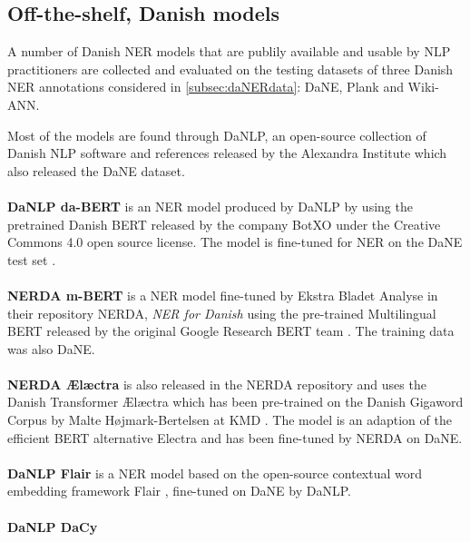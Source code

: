 \documentclass[main.tex]{subfiles}
\begin{document}
\subsection{Off-the-shelf, Danish models}
\label{sec:exidan}
A number of Danish NER models that are publily available and usable by NLP practitioners are collected and evaluated on the testing datasets of three Danish NER annotations considered in \ref{subsec:daNERdata}: DaNE, Plank and Wiki-ANN.

Most of the models are found through DaNLP\footnotemark, an open-source collection of Danish NLP software and references released by the Alexandra Institute which also released the DaNE dataset.
\\
\\
\textbf{DaNLP da-BERT}
is an NER model produced by DaNLP by using the pretrained Danish BERT released by the company BotXO \cite{botxo2019dabert} under the Creative Commons 4.0 open source license.
The model is fine-tuned for NER on the DaNE test set \cite{hvingelby2020dane}.\\
\\
\textbf{NERDA m-BERT}
is a NER model fine-tuned by Ekstra Bladet Analyse in their repository NERDA\footnotemark, \emph{NER for Danish} using the pre-trained Multilingual BERT released by the original Google Research BERT team \cite{devlin2019bert}.
The training data was also DaNE.
\\
\\
\textbf{NERDA Ælæctra}
is also released in the NERDA repository and uses the Danish Transformer Ælæctra which has been pre-trained on the Danish Gigaword Corpus by Malte Højmark-Bertelsen at KMD \cite{bertelsen2020lctra}.
The model is an adaption of the efficient BERT alternative Electra \cite{clark2020electra} and has been fine-tuned by NERDA on DaNE.\\
\\
\textbf{DaNLP Flair}
is a NER model based on the open-source contextual word embedding framework Flair \cite{akbik2019flair}, fine-tuned on DaNE by DaNLP.\\
\\
\textbf{DaNLP DaCy}
\end{document}
